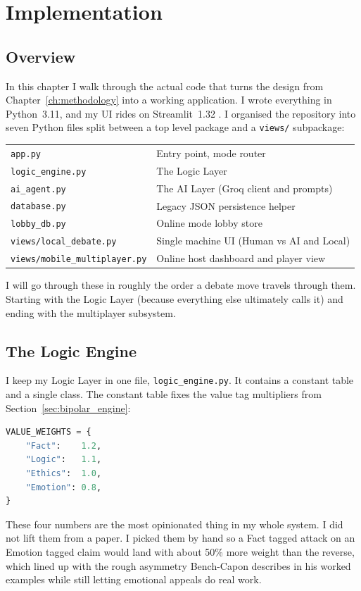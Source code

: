 \chapter{Implementation}
\label{ch:impl}

\section{Overview}
In this chapter I walk through the actual code that turns the design from Chapter~\ref{ch:methodology} into a working application. I wrote everything in Python~3.11, and my UI rides on Streamlit~1.32 \cite{streamlit2024}. I organised the repository into seven Python files split between a top level package and a \texttt{views/} subpackage:
\begin{center}
\begin{tabular}{ll}
\toprule
\texttt{app.py} & Entry point, mode router \\
\texttt{logic\_engine.py} & The Logic Layer \\
\texttt{ai\_agent.py} & The AI Layer (Groq client and prompts) \\
\texttt{database.py} & Legacy JSON persistence helper \\
\texttt{lobby\_db.py} & Online mode lobby store \\
\texttt{views/local\_debate.py} & Single machine UI (Human vs AI and Local) \\
\texttt{views/mobile\_multiplayer.py} & Online host dashboard and player view \\
\bottomrule
\end{tabular}
\end{center}
I will go through these in roughly the order a debate move travels through them. Starting with the Logic Layer (because everything else ultimately calls it) and ending with the multiplayer subsystem.

\section{The Logic Engine}
\label{sec:impl_engine}
I keep my Logic Layer in one file, \texttt{logic\_engine.py}. It contains a constant table and a single class. The constant table fixes the value tag multipliers from Section~\ref{sec:bipolar_engine}:
\begin{lstlisting}[language=Python]
VALUE_WEIGHTS = {
    "Fact":    1.2,
    "Logic":   1.1,
    "Ethics":  1.0,
    "Emotion": 0.8,
}
\end{lstlisting}
These four numbers are the most opinionated thing in my whole system. I did not lift them from a paper. I picked them by hand so a Fact tagged attack on an Emotion tagged claim would land with about 50\% more weight than the reverse, which lined up with the rough asymmetry Bench-Capon describes in his worked examples \cite{benchcapon2003value} while still letting emotional appeals do real work.


